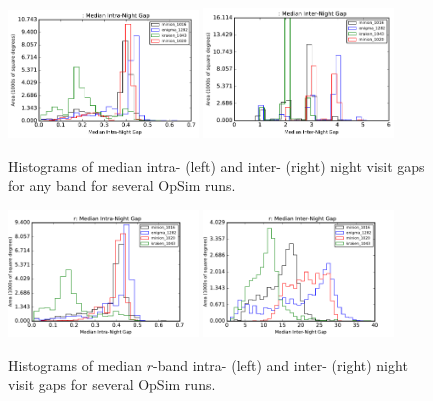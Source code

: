 \begin{figure}[hbt]
\centerline{
	\includegraphics[width=0.45\textwidth]{figs/transients/MedianIntra-NightGap.pdf}
	\includegraphics[width=0.45\textwidth]{figs/transients/MedianInter-NightGap.pdf}
}
\caption{ Histograms of median intra- (left) and inter- (right)
night visit gaps for any band for several OpSim runs. }
\label{fig:tgaps}
\end{figure}

\begin{figure}[hbt]
\centerline{
	\includegraphics[width=0.45\textwidth]{figs/transients/MedianIntra-NightGap_r.pdf}
	\includegraphics[width=0.45\textwidth]{figs/transients/MedianInter-NightGap_r.pdf}
}
\caption{ Histograms of median $r$-band intra- (left) and inter- (right)
night visit gaps for several OpSim runs. }
\label{fig:tgaps_r}
\end{figure}

